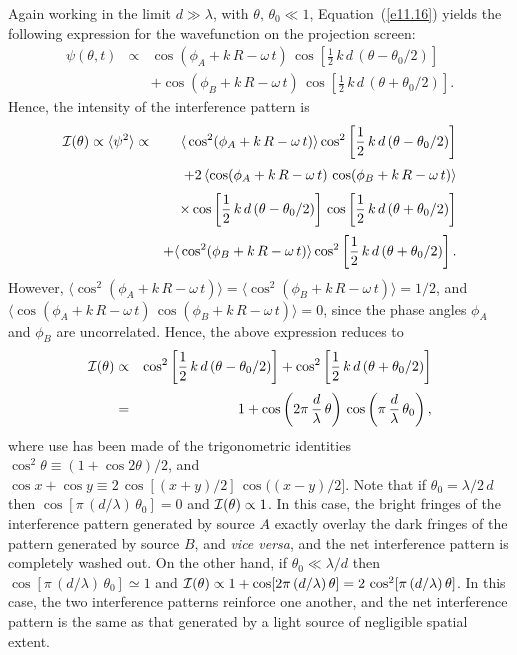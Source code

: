 Again working in the limit $d\gg \lambda$, with $\theta,\,\theta_0\ll 1$, Equation~(\ref{e11.16}) yields the following expression
for the wavefunction on the projection screen:
\begin{eqnarray}
\psi(\theta,t)&\propto& \cos(\phi_A+k\,R-\omega\,t)\,\cos\left[\frac{1}{2}\,k\,d\,(\theta-\theta_0/2)\right]\nonumber\\[0.5ex]
&&+ \cos(\phi_B+k\,R-\omega\,t)\,\cos\left[\frac{1}{2}\,k\,d\,(\theta+\theta_0/2)\right].
\end{eqnarray}
Hence, the intensity of the interference pattern is 
\begin{eqnarray}
{\cal I}(\theta)\propto \langle \psi^2\rangle&\propto& \langle\,\cos^2 (\phi_A+k\,R-\omega\,t)\rangle\cos^2\left[\frac{1}{2}\,k\,d\,(\theta-\theta_0/2)\right]\nonumber\\[0.5ex]
&&+2\,\langle \cos (\phi_A+k\,R-\omega\,t)\,\cos (\phi_B+k\,R-\omega\,t)\rangle\nonumber\\[0.5ex]
&&\times \cos\left[\frac{1}{2}\,k\,d\,(\theta-\theta_0/2)\right]\,\cos\left[\frac{1}{2}\,k\,d\,(\theta+\theta_0/2)\right]\nonumber\\[0.5ex]
&&+\langle\,\cos^2 (\phi_B+k\,R-\omega\,t)\rangle\cos^2\left[\frac{1}{2}\,k\,d\,(\theta+\theta_0/2)\right].
\end{eqnarray}
However, $\langle \cos^2 (\phi_A+k\,R-\omega\,t)\rangle= \langle \cos^2 (\phi_B+k\,R-\omega\,t)\rangle=1/2$, and
$\langle \cos (\phi_A+k\,R-\omega\,t)\,\cos (\phi_B+k\,R-\omega\,t)\rangle=0$, since the phase angles $\phi_A$ and $\phi_B$
are uncorrelated. Hence, the above expression reduces to
\begin{eqnarray}\label{e11.23}
{\cal I}(\theta)&\propto&\cos^2\left[\frac{1}{2}\,k\,d\,(\theta-\theta_0/2)\right]+ \cos^2\left[\frac{1}{2}\,k\,d\,(\theta+\theta_0/2)\right]
\nonumber\\[0.5ex] &=& 1 + \cos\left(2\pi\,\frac{d}{\lambda}\,\theta\right)\,\cos\left(\pi\,\frac{d}{\lambda}\,\theta_0\right),
\end{eqnarray}
where use has been made of the trigonometric identities $\cos^2\theta\equiv (1+\cos 2\theta)/2$, and
$\cos x + \cos y \equiv 2\,\cos[(x+y)/2]\,\cos((x-y)/2]$. 
Note that if $\theta_0=\lambda/2\,d$ then $\cos[\pi\,(d/\lambda)\,\theta_0]=0$ and ${\cal I}(\theta)\propto 1$. 
In this case, the bright fringes of the interference pattern generated by source $A$ exactly overlay the dark fringes
of the pattern generated by source $B$, and {\em vice versa}, and the net interference pattern is completely
washed out. On the other hand, if $\theta_0\ll \lambda/d$ then $\cos[\pi\,(d/\lambda)\,\theta_0]\simeq 1$ and
${\cal I}(\theta)\propto 1+\cos[2\pi\,(d/\lambda)\,\theta]=2\, \cos^2[\pi\,(d/\lambda)\,\theta]$. In this case, the two interference patterns
reinforce one another, and the net interference pattern is the same as that generated by a light  source
of negligible spatial extent. 

